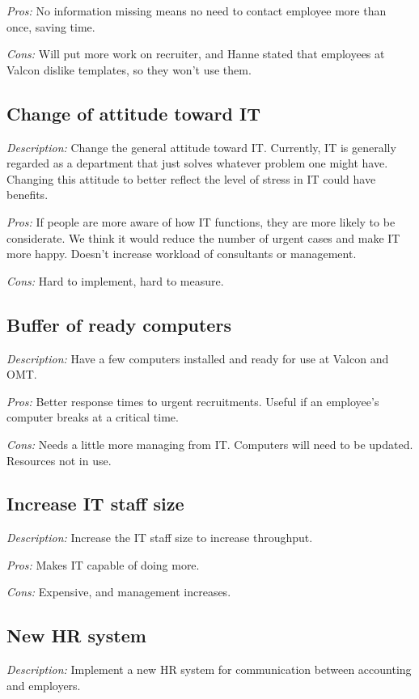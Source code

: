 \noindent \emph{Pros:} No information missing means no need to contact employee more than once, saving time.

\noindent \emph{Cons:} Will put more work on recruiter, and Hanne stated that employees at Valcon dislike templates, so they won't use them.

\subsection{Change of attitude toward IT}
\emph{Description:} Change the general attitude toward IT. Currently, IT is generally regarded as a department that just solves whatever problem one might have. Changing this attitude to better reflect the level of stress in IT could have benefits.

\noindent \emph{Pros:} If people are more aware of how IT functions, they are more likely to be considerate. We think it would reduce the number of urgent cases and make IT more happy. Doesn't increase workload of consultants or management.

\noindent \emph{Cons:} Hard to implement, hard to measure.

\subsection{Buffer of ready computers}
\emph{Description:} Have a few computers installed and ready for use at Valcon and OMT.

\noindent \emph{Pros:} Better response times to urgent recruitments. Useful if an employee's computer breaks at a critical time.

\noindent \emph{Cons:} Needs a little more managing from IT. Computers will need to be updated. Resources not in use.

\subsection{Increase IT staff size}
\emph{Description:} Increase the IT staff size to increase throughput.

\noindent \emph{Pros:} Makes IT capable of doing more.

\noindent \emph{Cons:} Expensive, and management increases.

\subsection{New HR system}
\emph{Description:} Implement a new HR system for communication between accounting and employers.

